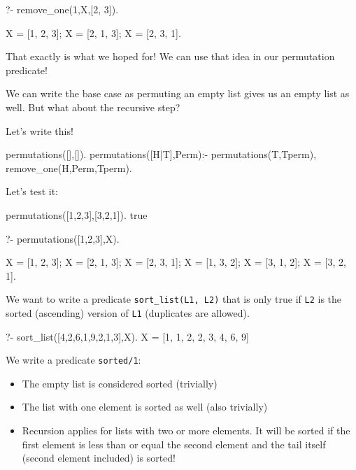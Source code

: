 \begin{codeblock}
?- remove_one(1,X,[2, 3]).

X = [1, 2, 3];
X = [2, 1, 3];
X = [2, 3, 1].
\end{codeblock}

That exactly is what we hoped for! We can use that idea in our permutation predicate!

We can write the base case as permuting an empty list gives us an empty list as well. But what about the recursive step?


Let's write this!

\begin{codeblock}
permutations([],[]).
permutations([H|T],Perm):-
    permutations(T,Tperm),
    remove_one(H,Perm,Tperm).
\end{codeblock}

Let's test it:

\begin{codeblock}
permutations([1,2,3],[3,2,1]).
true
\end{codeblock}

\begin{codeblock}
?- permutations([1,2,3],X).

X = [1, 2, 3];
X = [2, 1, 3];
X = [2, 3, 1];
X = [1, 3, 2];
X = [3, 1, 2];
X = [3, 2, 1].
\end{codeblock}



We want to write a predicate \texttt{sort\_list(L1, L2)} that is only true if \texttt{L2} is the sorted (ascending) version of \texttt{L1} (duplicates are allowed).

\begin{codeblock}
?- sort_list([4,2,6,1,9,2,1,3],X).
X = [1, 1, 2, 2, 3, 4, 6, 9]
\end{codeblock}



We write a predicate \texttt{sorted/1}:
\begin{itemize}
    \item The empty list is considered sorted (trivially)
    \item The list with one element is sorted as well (also trivially)
    \item Recursion applies for lists with two or more elements. It will be sorted if the first element is less than or equal the second element and the tail itself (second element included) is sorted!
\end{itemize}

